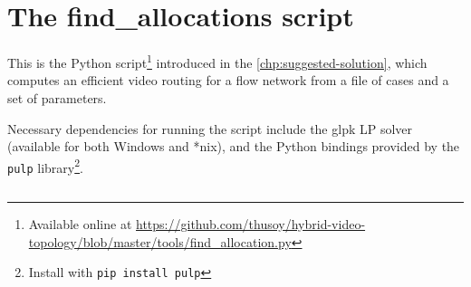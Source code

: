\chapter{The find\_allocations script}
\label{chp:get-bw-alloc}

This is the Python script\footnote{Available online at \url{https://github.com/thusoy/hybrid-video-topology/blob/master/tools/find_allocation.py}} introduced in the \autoref{chp:suggested-solution}, which computes an efficient video routing for a flow network from a file of cases and a set of parameters.

Necessary dependencies for running the script include the glpk LP solver (available for both Windows and *nix), and the Python bindings provided by the \texttt{pulp} library\footnote{Install with \texttt{pip install pulp}}.

\inputminted[linenos,
               numbersep=5pt,
               frame=lines,
               framesep=2mm]{python}{tools/find_allocation.py}
